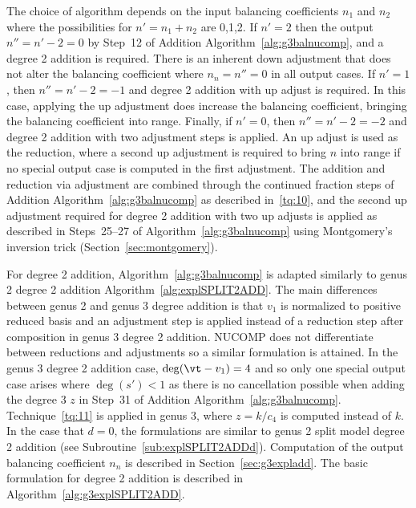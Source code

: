The choice of algorithm depends on the input balancing coefficients $n_1$ and
$n_2$ where the possibilities for $n' =n_1 + n_2$ are 0,1,2. If $n' = 2$ then
the output $n'' = n'-2 = 0$ by Step~12 of Addition
Algorithm~\ref{alg:g3balnucomp}, and a degree 2 addition is required. There is
an inherent down adjustment that does not alter the balancing coefficient where
$n_n = n'' = 0$ in all output cases. If $n'=1$, then $n'' = n' - 2= -1$ and
degree 2 addition with up adjust is required. In this case, applying the up
adjustment does increase the balancing coefficient, bringing the balancing
coefficient into range. Finally, if $n' = 0$, then $n'' = n' - 2 = -2$ and degree 2
addition with two adjustment steps is applied. An up adjust is used as the
reduction, where a second up adjustment is required to bring $n$ into
range if no special output case is computed in the first adjustment. The addition and reduction via
adjustment are combined through the continued fraction steps of Addition
Algorithm~\ref{alg:g3balnucomp} as described in~\ref{tq:10}, and the second up
adjustment required for degree 2 addition with two up adjusts is applied as
described in Steps~25--27 of Algorithm~\ref{alg:g3balnucomp} using Montgomery's
inversion trick (Section~\ref{sec:montgomery}). 

For degree 2 addition, Algorithm~\ref{alg:g3balnucomp} is adapted  similarly to
genus 2 degree 2 addition Algorithm~\ref{alg:explSPLIT2ADD}.  The main
differences between genus 2 and genus 3 degree addition is that $v_1$ is
normalized to positive reduced basis and an adjustment step is applied instead
of a reduction step after composition in genus 3 degree 2 addition. NUCOMP does
not differentiate between reductions and adjustments so a similar formulation is
attained. In the genus 3 degree 2 addition case, $\deg(\vt - v_1) = 4$ and so
only one special output case arises where $\deg(s') <1$ as there is no
cancellation possible when adding the degree 3 $z$ in Step~31 of Addition
Algorithm~\ref{alg:g3balnucomp}. Technique~\ref{tq:11} is applied in genus 3,
where $z = k/c_4$ is computed instead of $k$. In the case that $d=0$, the
formulations are similar to genus 2 split model degree 2 addition (see
Subroutine~\ref{sub:explSPLIT2ADDd}). Computation of the output balancing
coefficient $n_n$ is described in Section~\ref{sec:g3expladd}. The basic
formulation for degree 2 addition is described in
Algorithm~\ref{alg:g3explSPLIT2ADD}.


